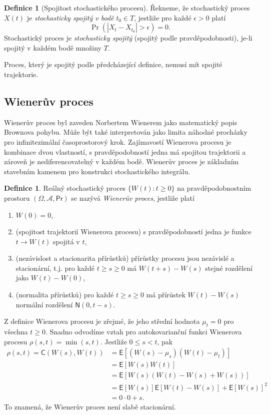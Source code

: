 \documentclass[a4paper,12pt]{report}
\theoremstyle{definition} \newtheorem{definice}[veta]{Definice}
\theoremstyle{remark}
\begin{document}
\begin{definice}[Spojitost stochastického procesu]
Řekneme, že stochastický proces $X(t)$ je \textit{stochasticky spojitý v bodě} $t_0\in T$, jestliže pro každé $\epsilon>0$ platí
$$\Pr(|X_t-X_{t_0}|>\epsilon)=0.$$
Stochastický proces je  \textit{stochasticky spojitý} (spojitý podle pravděpodobnosti), je-li spojitý v každém bodě množiny $T$.
\end{definice}
Proces, který je spojitý podle předcházející definice, nemusí mít spojité trajektorie.


\subsection{Wienerův proces}\label{WP_kap}
Wienerův proces byl zaveden Norbertem Wienerem jako matematický popis Brownova pohybu.
Může být také interpretován jako limita náhodné procházky pro infinitezimální časoprostorový krok.
Zajímavostí Wienerova procesu je kombinace dvou vlastností,
s pravděpodobností jedna má spojitou trajektorii a zároveň je nediferencovatelný v každém bodě. 
Wienerův proces je základním stavebním kamenem pro konstrukci stochastického integrálu.

\begin{definice}
Reálný stochastický proces $\{W(t):t\ge0\}$ na pravděpodobnostním prostoru $(\Omega,\mathcal{A},\mathsf{Pr})$ se nazývá \textit{Wienerův proces}, jestliže platí
\begin{enumerate}
\item[1.]$W(0)=0$, 
\item[2.](spojitost trajektorií Wienerova procesu) s pravděpodobností jedna je funkce $t\to W(t)$ spojitá v $t$,
\item[3.](nezávislost a stacionarita přírůstků) přírůstky procesu jsou nezávislé a stacionární, t.j.  pro každé $t\ge s\ge0$ má $W(t+s)-W(s)$ stejné rozdělení jako $W(t)-W(0)$,
\item[4.](normalita přírůstků) pro každé $t\ge s\ge0$ má přírůstek $W(t)-W(s)$ normální rozdělení $\mathsf{N}(0, t-s)$.
\end{enumerate}
\end{definice}

Z definice Wienerova procesu je zřejmé, že jeho střední hodnota $\mu_t=0$ pro všechna $t\ge0$.
Snadno odvodíme vztah pro autokovarianční funkci Wienerova procesu $\rho(s,t)=\min(s,t)$.
Jestliže $0\leq s<t$, pak
\begin{align*}
\rho(s,t)=\mathsf{C}(W(s),W(t))&=\mathsf{E}{\left[(W(s)-\mu_s)(W(t)-\mu_t)\right]} \\
&=\mathsf{E}{\left[W(s)W(t)\right]}  \\
&=\mathsf{E}{\left[W(s)(W(t)-W(s)+W(s))\right]} \\
&=\mathsf{E}{\left[W(s)\right]}\mathsf{E}{\left[W(t)-W(s)\right]}+\mathsf{E}{\left[W(s)\right]}^2 \\
&=0\cdot0+s.
\end{align*}
To znamená, že Wienerův proces není slabě stacionární.
\end{document}
